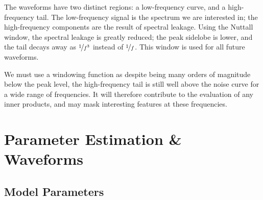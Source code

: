 The waveforms have two distinct regions: a low-frequency curve, and a high-frequency tail. The low-frequency signal is the spectrum we are interested in; the high-frequency components are the result of spectral leakage. Using the Nuttall window, the spectral leakage is greatly reduced; the peak sidelobe is lower, and the tail decays away as $\nicefrac{1}{f^3}$ instead of $\nicefrac{1}{f}$. This window is used for all future waveforms.

We must use a windowing function as despite being many orders of magnitude below the peak level, the high-frequency tail is still well above the noise curve for a wide range of frequencies. It will therefore contribute to the evaluation of any inner products, and may mask interesting features at these frequencies.

\section{Parameter Estimation \& Waveforms}

\subsection{Model Parameters}\label{sec:Parameters}

